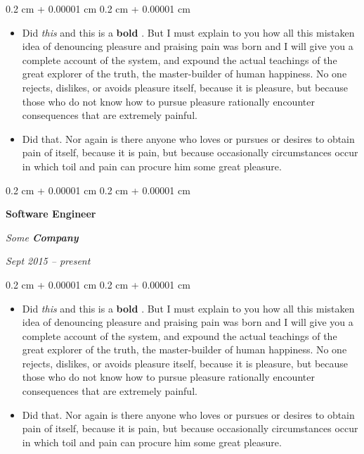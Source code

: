 \documentclass[10pt, letterpaper]{article}
\newenvironment{highlights}{
    \begin{itemize}[
        topsep=0.10 cm,
        parsep=0.10 cm,
        partopsep=0pt,
        itemsep=0pt,
        leftmargin=0.4 cm + 10pt
    ]
}{
    \end{itemize}
} %
\newenvironment{onecolentry}{
    \begin{adjustwidth}{
        0.2 cm + 0.00001 cm
    }{
        0.2 cm + 0.00001 cm
    }
}{
    \end{adjustwidth}
} %
\newenvironment{twocolentry}[2][]{
    \onecolentry
    \def\secondColumn{#2}
    \setcolumnwidth{\fill, 4.5 cm}
    \begin{paracol}{2}
}{
    \switchcolumn \raggedleft \secondColumn
    \end{paracol}
    \endonecolentry
} %
\let\hrefWithoutArrow\href
\renewcommand{\href}[2]{\hrefWithoutArrow{#1}{\ifthenelse{\equal{#2}{}}{ }{#2 }\raisebox{.15ex}{\footnotesize \faExternalLink*}}}
\begin{document}
        \vspace{0.10 cm}
        \begin{onecolentry}
            \begin{highlights}
                \item Did \textit{this} and this is a \textbf{bold} \href{https://example.com}{link}. But I must explain to you how all this mistaken idea of denouncing pleasure and praising pain was born and I will give you a complete account of the system, and expound the actual teachings of the great explorer of the truth, the master-builder of human happiness. No one rejects, dislikes, or avoids pleasure itself, because it is pleasure, but because those who do not know how to pursue pleasure rationally encounter consequences that are extremely painful.
                \item Did that. Nor again is there anyone who loves or pursues or desires to obtain pain of itself, because it is pain, but because occasionally circumstances occur in which toil and pain can procure him some great pleasure.
            \end{highlights}
        \end{onecolentry}


        \vspace{0.2 cm}

        \begin{twocolentry}{
            
            
        \textit{Sept 2015 – present}}
            \textbf{Software Engineer}
            
            \textit{Some \textbf{Company}}
        \end{twocolentry}

        \vspace{0.10 cm}
        \begin{onecolentry}
            \begin{highlights}
                \item Did \textit{this} and this is a \textbf{bold} \href{https://example.com}{link}. But I must explain to you how all this mistaken idea of denouncing pleasure and praising pain was born and I will give you a complete account of the system, and expound the actual teachings of the great explorer of the truth, the master-builder of human happiness. No one rejects, dislikes, or avoids pleasure itself, because it is pleasure, but because those who do not know how to pursue pleasure rationally encounter consequences that are extremely painful.
                \item Did that. Nor again is there anyone who loves or pursues or desires to obtain pain of itself, because it is pain, but because occasionally circumstances occur in which toil and pain can procure him some great pleasure.
            \end{highlights}
        \end{onecolentry}
\end{document}
